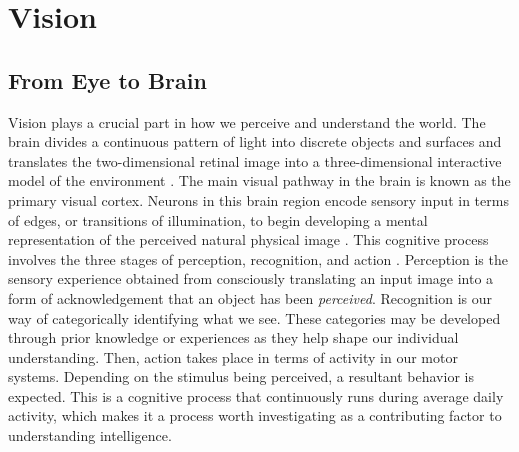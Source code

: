 \documentclass[12pt]{article}
\begin{document}
\section{Vision}
\subsection{From Eye to Brain}
Vision plays a crucial part in how we perceive and understand the world. The brain divides a continuous pattern of light into discrete objects and surfaces and translates the two-dimensional retinal image into a three-dimensional interactive model of the environment \cite{c6}. The main visual pathway in the brain is known as the primary visual cortex. Neurons in this brain region encode sensory input in terms of edges, or transitions of illumination, to begin developing a mental representation of the perceived natural physical image \cite{c3}. This cognitive process involves the three stages of perception, recognition, and action \cite{c9}. Perception is the sensory experience obtained from consciously translating an input image into a form of acknowledgement that an object has been \emph{perceived}. Recognition is our way of categorically identifying what we see. These categories may be developed through prior knowledge or experiences as they help shape our individual understanding. Then, action takes place in terms of activity in our motor systems. Depending on the stimulus being perceived, a resultant behavior is expected. This is a cognitive process that continuously runs during average daily activity, which makes it a process worth investigating as a contributing factor to understanding intelligence.  
\end{document}
